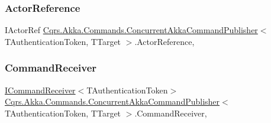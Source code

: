 \subsubsection{\texorpdfstring{Actor\+Reference}{ActorReference}}
{\footnotesize\ttfamily I\+Actor\+Ref \hyperlink{classCqrs_1_1Akka_1_1Commands_1_1ConcurrentAkkaCommandPublisher}{Cqrs.\+Akka.\+Commands.\+Concurrent\+Akka\+Command\+Publisher}$<$ T\+Authentication\+Token, T\+Target $>$.Actor\+Reference\hspace{0.3cm}{\ttfamily [get]}, {\ttfamily [protected]}}

\mbox{\label{classCqrs_1_1Akka_1_1Commands_1_1ConcurrentAkkaCommandPublisher_a000c2cddf20768b5feec16a8f4e02587_a000c2cddf20768b5feec16a8f4e02587}} 
\subsubsection{\texorpdfstring{Command\+Receiver}{CommandReceiver}}
{\footnotesize\ttfamily \hyperlink{interfaceCqrs_1_1Commands_1_1ICommandReceiver}{I\+Command\+Receiver}$<$T\+Authentication\+Token$>$ \hyperlink{classCqrs_1_1Akka_1_1Commands_1_1ConcurrentAkkaCommandPublisher}{Cqrs.\+Akka.\+Commands.\+Concurrent\+Akka\+Command\+Publisher}$<$ T\+Authentication\+Token, T\+Target $>$.Command\+Receiver\hspace{0.3cm}{\ttfamily [get]}, {\ttfamily [protected]}}

